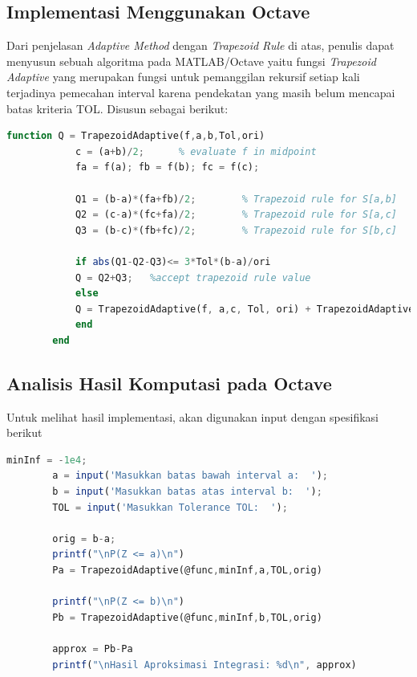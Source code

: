 \documentclass[journal,12pt,onecolumn,a4paper]{IEEEtran}
\begin{document}
\subsection{Implementasi Menggunakan Octave}

Dari penjelasan \emph{Adaptive Method} dengan \emph{Trapezoid Rule} di atas, penulis dapat menyusun sebuah algoritma pada MATLAB/Octave yaitu fungsi \emph{Trapezoid Adaptive} yang merupakan fungsi untuk pemanggilan rekursif setiap kali terjadinya pemecahan interval karena pendekatan yang masih belum mencapai batas kriteria TOL. Disusun sebagai berikut:
\begin{center}
	\begin{lstlisting}[language=Octave]
		function Q = TrapezoidAdaptive(f,a,b,Tol,ori)
			c = (a+b)/2;      % evaluate f in midpoint
			fa = f(a); fb = f(b); fc = f(c);
		
			Q1 = (b-a)*(fa+fb)/2;        % Trapezoid rule for S[a,b]
			Q2 = (c-a)*(fc+fa)/2;        % Trapezoid rule for S[a,c]
			Q3 = (b-c)*(fb+fc)/2;        % Trapezoid rule for S[b,c]
		
			if abs(Q1-Q2-Q3)<= 3*Tol*(b-a)/ori
			Q = Q2+Q3;   %accept trapezoid rule value
			else
			Q = TrapezoidAdaptive(f, a,c, Tol, ori) + TrapezoidAdaptive(f,c,b, Tol, ori); % use algorithm for [a,c] and [c,b]
			end
	  	end
	\end{lstlisting}
\end{center}

\subsection{Analisis Hasil Komputasi pada Octave}

Untuk melihat hasil implementasi, akan digunakan input dengan spesifikasi berikut

\begin{center}
	\begin{lstlisting}[language=Octave]
		minInf = -1e4;
		a = input('Masukkan batas bawah interval a:  ');
		b = input('Masukkan batas atas interval b:  ');
		TOL = input('Masukkan Tolerance TOL:  ');

		orig = b-a;
		printf("\nP(Z <= a)\n")
		Pa = TrapezoidAdaptive(@func,minInf,a,TOL,orig)

		printf("\nP(Z <= b)\n")
		Pb = TrapezoidAdaptive(@func,minInf,b,TOL,orig)

		approx = Pb-Pa
		printf("\nHasil Aproksimasi Integrasi: %d\n", approx)
	\end{lstlisting}
\end{center}
\end{document}
